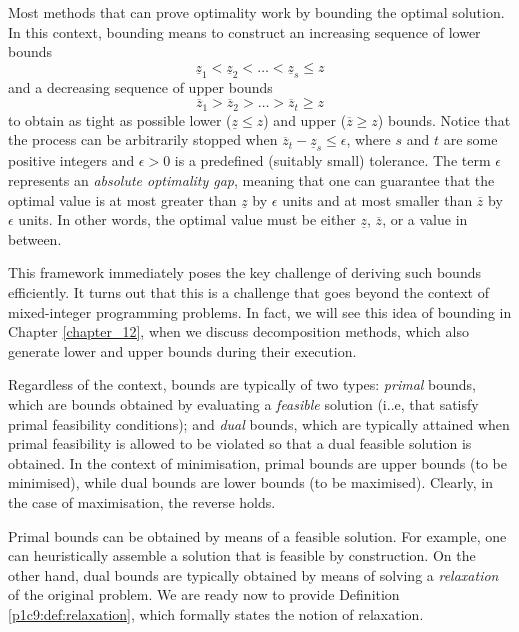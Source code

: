 Most methods that can prove optimality work by bounding the optimal solution. In this context, bounding means to construct an increasing sequence of lower bounds
%
\begin{equation*}
	\underline{z}_1 < \underline{z}_2 < \dots < \underline{z}_s \leq z	
\end{equation*}
%
and a decreasing sequence of upper bounds
%
\begin{equation*}
	\overline{z}_1 > \overline{z}_2 > \dots > \overline{z}_t \geq z
\end{equation*}
%
to obtain as tight as possible lower ($\underline{z} \leq z$) and upper ($\overline{z} \geq z$) bounds. Notice that the process can be arbitrarily stopped when $\overline{z}_t - \underline{z}_s \leq \epsilon$, where $s$ and $t$ are some positive integers and $\epsilon > 0$ is a predefined (suitably small) tolerance. The term $\epsilon$ represents an \emph{absolute optimality gap}, meaning that one can guarantee that the optimal value is at most greater than $\underline{z}$ by $\epsilon$ units and at most smaller than $\overline{z}$ by $\epsilon$ units. In other words, the optimal value must be either $\underline{z}$, $\overline{z}$, or a value in between.

This framework immediately poses the key challenge of deriving such bounds efficiently. It turns out that this is a challenge that goes beyond the context of mixed-integer programming problems. In fact, we will see this idea of bounding in Chapter \ref{chapter_12}, when we discuss decomposition methods, which also generate lower and upper bounds during their execution.

Regardless of the context, bounds are typically of two types: \emph{primal} bounds, which are bounds obtained by evaluating a \emph{feasible} solution (i..e, that satisfy primal feasibility conditions); and \emph{dual} bounds, which are typically attained when primal feasibility is allowed to be violated so that a dual feasible solution is obtained. In the context of minimisation, primal bounds are upper bounds (to be minimised), while dual bounds are lower bounds (to be maximised). Clearly, in the case of maximisation, the reverse holds. 

Primal bounds can be obtained by means of a feasible solution. For example, one can heuristically assemble a solution that is feasible by construction. On the other hand, dual bounds are typically obtained by means of solving a \emph{relaxation} of the original problem. We are ready now to provide Definition \ref{p1c9:def:relaxation}, which formally states the notion of relaxation.

